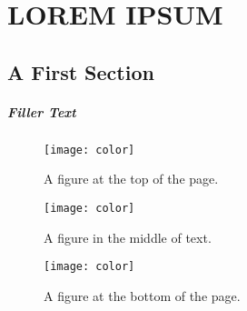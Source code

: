 \chapter{LOREM IPSUM}

\section*{A First Section}

\paragraph{Filler Text} \lipsum[1-6]
%
\begin{figure}[t]
  \centering
  \texttt{[image: color]}%
  \caption{A figure at the top of the page.}
  \label{fig:ch3.1}
\end{figure}
%
\lipsum[7-13]
%
\begin{figure}[!h]
  \centering
  \texttt{[image: color]}%
  \caption{A figure in the middle of text.}
  \label{fig:ch3.2}
\end{figure}
%
\begin{figure}[!b]
  \centering
  \texttt{[image: color]}%
  \caption{A figure at the bottom of the page.}
  \label{fig:ch3.3}
\end{figure}
%
\lipsum[14-20]
